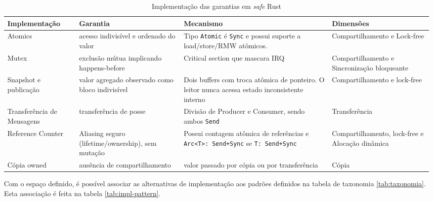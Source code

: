 \begin{table}[ht]
  \centering
  \caption{Implementação das garantias em \textit{safe} Rust}
  \label{tab:impl-safe-rust}
  \begin{tabularx}{\textwidth}{>{\hsize=0.6\hsize}X >{\hsize=1.0\hsize}X >{\hsize=1.5\hsize}X >{\hsize=0.9\hsize}X}
    \toprule
    Implementação & Garantia & Mecanismo & Dimensões \\
    \midrule
    Atomics & acesso indivisível e ordenado do valor & Tipo \texttt{Atomic} é \texttt{Sync} e possui suporte a load/store/RMW atômicos. & Compartilhamento e Lock-free \\
    \hline
    Mutex & exclusão mútua implicando happens-before & Critical section que mascara IRQ & Compartilhamento e Sincronização bloqueante \\
    \hline
    Snapshot e publicação & valor agregado observado como bloco indivisível & Dois buffers com troca atômica de ponteiro. O leitor nunca acessa estado inconsistente interno & Compartilhamento e lock-free \\
    \hline
    Transferência de Mensagens & transferência de posse & Divisão de Producer e Consumer, sendo ambos \texttt{Send} & Transferência \\
    \hline
    Reference Counter & Aliasing seguro (lifetime/ownership), sem mutação & Possui contagem atômica de referências e \texttt{Arc<T>: Send+Sync} se \texttt{T: Send+Sync} & Compartilhamento, lock-free e Alocação dinâmica \\
    \hline
    Cópia owned & ausência de compartilhamento & valor passado por cópia ou por transferência & Cópia \\
    \bottomrule
  \end{tabularx}
\end{table}

Com o espaço definido, é possível associar as alternativas de implementação aos padrões definidos na tabela de taxonomia \ref{tab:taxonomia}. Esta associação é feita na tabela \ref{tab:impl-pattern}.

